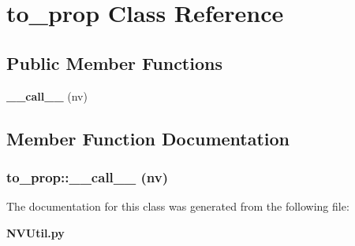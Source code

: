 \section{to\_\-prop Class Reference}
\label{classto__prop}
\subsection*{Public Member Functions}
\begin{CompactItemize}
\item 
{\bf \_\-\_\-call\_\-\_\-} (nv)
\end{CompactItemize}


\subsection{Member Function Documentation}
\subsubsection{\setlength{\rightskip}{0pt plus 5cm}to\_\-prop::\_\-\_\-call\_\-\_\- (nv)}\label{classto__prop_to__propa0}




The documentation for this class was generated from the following file:\begin{CompactItemize}
\item 
{\bf NVUtil.py}\end{CompactItemize}
